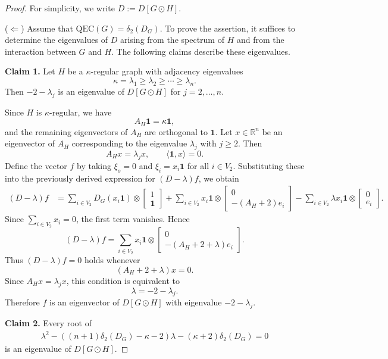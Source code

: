 \documentclass[pdflatex,sn-mathphys-num]{sn-jnl}
\theoremstyle{thmstyleone}%
\theoremstyle{thmstyletwo}%
\theoremstyle{thmstylethree}%
\begin{document}
\begin{proof}
For simplicity, we write $D:=D[G\odot H]$.

\medskip
\noindent
($\Leftarrow$)
Assume that $\mathrm{QEC}(G)=\delta_2(D_G)$.
To prove the assertion, it suffices to determine the eigenvalues of $D$
arising from the spectrum of $H$ and from the interaction between $G$
and $H$. The following claims describe these eigenvalues.

\medskip
\noindent
\textbf{Claim 1.}
Let $H$ be a $\kappa$-regular graph with adjacency eigenvalues
\[
\kappa=\lambda_1 \ge \lambda_2 \ge \cdots \ge \lambda_n .
\]
Then $-2-\lambda_j$ is an eigenvalue of $D[G\odot H]$ for $j=2,\dots,n$.

Since $H$ is $\kappa$-regular, we have
\[
A_H\mathbf{1}=\kappa\mathbf{1},
\]
and the remaining eigenvectors of $A_H$ are orthogonal to $\mathbf{1}$.
Let $x\in\mathbb{R}^n$ be an eigenvector of $A_H$ corresponding to the eigenvalue $\lambda_j$ with $j\ge2$. Then
\[
A_Hx=\lambda_j x,
\qquad
\langle \mathbf{1},x\rangle=0.
\]
Define the vector $f$ by taking $\xi_o=0$ and
$\xi_i=x_i\mathbf{1}$ for all $i\in V_2$. Substituting these into the previously derived expression for $(D-\lambda)f$, we obtain
\begin{align*}
(D-\lambda)f
&=
\sum_{i\in V_2}D_G(x_i\mathbf{1})\otimes
\begin{bmatrix}1\\\mathbf{1}\end{bmatrix}
+
\sum_{i\in V_2}x_i\mathbf{1}\otimes
\begin{bmatrix}0\\-(A_H+2)e_i\end{bmatrix}
-
\sum_{i\in V_2}\lambda x_i\mathbf{1}\otimes
\begin{bmatrix}0\\e_i\end{bmatrix}.
\end{align*}
Since $\sum_{i\in V_2}x_i=0$, the first term vanishes. Hence
\[
(D-\lambda)f
=
\sum_{i\in V_2}x_i\mathbf{1}\otimes
\begin{bmatrix}0\\-(A_H+2+\lambda)e_i\end{bmatrix}.
\]
Thus $(D-\lambda)f=0$ holds whenever
\[
(A_H+2+\lambda)x=0.
\]
Since $A_Hx=\lambda_jx$, this condition is equivalent to
\[
\lambda=-2-\lambda_j.
\]
Therefore $f$ is an eigenvector of $D[G\odot H]$ with eigenvalue $-2-\lambda_j$.

\medskip
\noindent
\textbf{Claim 2.}
Every root of
\begin{align}\label{eq root of lambda=psi}
\lambda^2-((n+1)\delta_2(D_G)-\kappa-2)\lambda-(\kappa+2)\delta_2(D_G)=0
\end{align}
is an eigenvalue of $D[G\odot H]$.


\end{proof}
\end{document}

